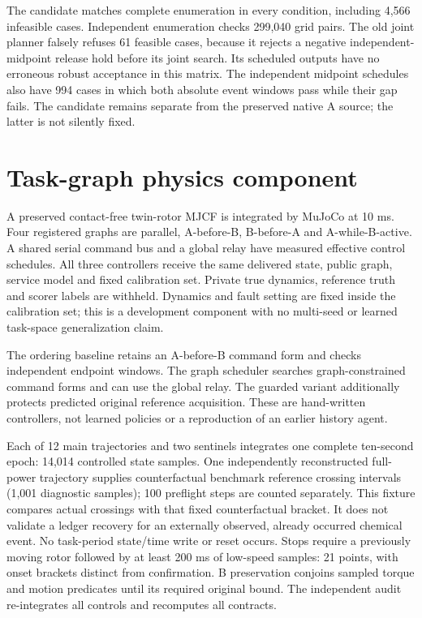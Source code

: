 \documentclass{article}
\begin{document}
The candidate matches complete enumeration in every condition, including
4,566 infeasible cases. Independent enumeration checks 299,040 grid pairs.
The old joint planner falsely refuses 61 feasible cases, because it rejects
a negative independent-midpoint release hold before its joint search.
Its scheduled outputs have no erroneous robust acceptance in this matrix.
The independent midpoint schedules also have 994 cases in which both
absolute event windows pass while their gap fails. The candidate remains
separate from the preserved native A source; the latter is not silently fixed.

\section{Task-graph physics component}
A preserved contact-free twin-rotor MJCF is integrated by MuJoCo at 10 ms.
Four registered graphs are parallel, A-before-B, B-before-A and A-while-B-active.
A shared serial command bus and a global relay have measured effective
control schedules. All three controllers receive the same delivered state,
public graph, service model and fixed calibration set. Private true dynamics,
reference truth and scorer labels are withheld. Dynamics and fault setting
are fixed inside the calibration set; this is a development component with
no multi-seed or learned task-space generalization claim.

The ordering baseline retains an A-before-B command form and checks
independent endpoint windows. The graph scheduler searches graph-constrained
command forms and can use the global relay. The guarded variant additionally
protects predicted original reference acquisition. These are hand-written
controllers, not learned policies or a reproduction of an earlier history agent.

Each of 12 main trajectories and two sentinels integrates one complete ten-second
epoch: 14,014 controlled state samples. One independently reconstructed
full-power trajectory supplies counterfactual benchmark reference crossing intervals
(1,001 diagnostic samples); 100 preflight steps are counted separately.
This fixture compares actual crossings with that fixed counterfactual bracket.
It does not validate a ledger recovery for an externally observed, already
occurred chemical event.
No task-period state/time write or reset occurs. Stops require a previously
moving rotor followed by at least 200 ms of low-speed samples: 21 points,
with onset brackets distinct from confirmation. B preservation conjoins
sampled torque and motion predicates until its required original bound.
The independent audit re-integrates all controls and recomputes all contracts.
\end{document}
